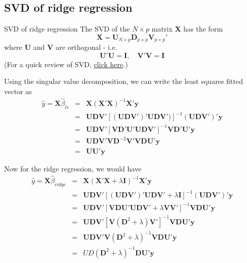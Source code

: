 \documentclass{beamer}
\newcommand{\X}{\bm{X}}
\newcommand{\y}{\bm{y}}
\begin{document}
\subsection{SVD of ridge regression}
\begin{frame}{SVD of ridge regression}
The SVD of the $N\times p$ matrix $\X$ has the form
\[
\X=\bm{U}_{N\times p}\bm{D}_{p\times p}\bm{V}_{p\times p}'
\]
where $\bm{U}$ and $\bm{V}$ are orthogonal - i.e. 
\[
\bm{U}'\bm{U}=\bm{I},\quad \bm{V}'\bm{V}=\bm{I}
\]
(For a quick review of SVD, \href{https://mathworld.wolfram.com/SingularValueDecomposition.html}{click here}.)

Using the singular value decomposition, we can write the least squares fitted vector as 
\begin{eqnarray*}
\hat{y}=\X\hat{\beta}_{ls}&=&\X(\X'\X)^{-1}\X'\y\\
&=&\bm{UDV}'[(\bm{UDV}')'\bm{UDV}')]^{-1}(\bm{UDV}')'\y\\
&=&\bm{UDV}'[\bm{V}\bm{D}'\bm{U}'\bm{UDV}']^{-1}\bm{V}\bm{D}'\bm{U}'\y\\
&=&\bm{UDV}'\bm{V}\bm{D}^{-2}\bm{V}'\bm{V}\bm{D}\bm{U'}\y\\
&=&\bm{UU}'\y
\end{eqnarray*}
\end{frame}

\begin{frame}
Now for the ridge regression, we would have
\begin{eqnarray*}
\hat{y}=\X\hat{\beta}_{ridge}&=&\X(\X'\X+\lambda\bm{I})^{-1}\X'\y\\
&=&\bm{UDV}'[(\bm{UDV}')'\bm{UDV}'+\lambda\bm{I}]^{-1}(\bm{UDV}')'\y\\
&=&\bm{UDV}'[\bm{V}\bm{D}\bm{U}'\bm{UDV}'+\lambda\bm{V}\bm{V}']^{-1}\bm{V}\bm{D}\bm{U}'\y\\
&=&\bm{UDV}'[\bm{V}(\bm{D}^2+\lambda)\bm{V}']^{-1}\bm{VDU}'\y\\
&=&\bm{UDV}'\bm{V}(\bm{D}^2+\lambda)^{-1}\bm{VDU}'\y\\
&=&UD(\bm{D}^2+\lambda)^{-1}\bm{DU}'\y
\end{eqnarray*}
\end{frame}
%
%
\end{document}
